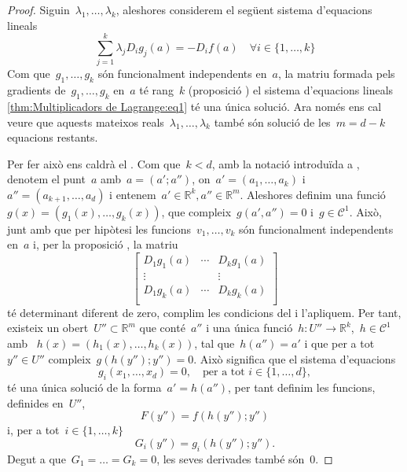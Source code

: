 \documentclass[../../main.tex]{subfiles}
\begin{document}
    \begin{proof}
        Siguin~\(\lambda_{1},\dots,\lambda_{k}\), aleshores considerem el següent sistema d'equacions lineals
        \begin{equation}\label{thm:Multiplicadors de Lagrange:eq1}
        \sum_{j=1}^{k}\lambda_{j}D_{i}g_{j}(a)=-D_{i}f(a)\quad\forall i\in\{1,\dots,k\}
        \end{equation}
        Com que~\(g_{1},\dots,g_{k}\) són funcionalment independents en~\(a\),
        la matriu formada pels gradients de~\(g_{1},\dots,g_{k}\) en~\(a\) té
        rang~\(k\) (proposició ) el sistema d'equacions lineals \eqref{thm:Multiplicadors de Lagrange:eq1} té una única solució.
        Ara només ens cal veure que aquests mateixos reals~\(\lambda_{1},\dots,\lambda_{k}\) també són solució de les~\(m=d-k\) equacions restants.

        Per fer això ens caldrà el .
        Com que~\(k<d\), amb la notació introduïda a , denotem el punt~\(a\) amb~\(a=(a';a'')\), on~\(a'=(a_{1},\dots,a_{k})\) i~\(a''=(a_{k+1},\dots,a_{d})\) i entenem~\(a'\in\mathbb{R}^{k},a''\in\mathbb{R}^{m}\).
        Aleshores definim una funció~\(g(x)=(g_{1}(x),\dots,g_{k}(x))\), que compleix~\(g(a',a'')=0\) i~\(g\in\mathcal{C}^{1}\).
        Això, junt amb que per hipòtesi les funcions~\(v_{1},\dots,v_{k}\) són funcionalment independents en~\(a\) i, per la proposició , la matriu
        \[\left[\begin{matrix}
        D_{1}g_{1}(a) & \cdots & D_{k}g_{1}(a)\\
        \vdots & & \vdots\\
        D_{1}g_{k}(a) & \cdots & D_{k}g_{k}(a)\\
        \end{matrix}\right]\]
        té determinant diferent de zero, complim les condicions del  i l'apliquem.
        Per tant, existeix un obert~\(U''\subset\mathbb{R}^{m}\) que conté~\(a''\) i una única funció~\(h\colon U''\to\mathbb{R}^{k}\),~\(h\in\mathcal{C}^{1}\) amb ~\(h(x)=(h_{1}(x),\dots,h_{k}(x))\), tal que~\(h(a'')=a'\) i que per a tot~\(y''\in U''\) compleix~\(g(h(y'');y'')=0\).
        Això significa que el sistema d'equacions
        \[
            g_{i}(x_{1},\dots,x_{d})=0,\quad\text{per a tot }i\in\{1,\dots,d\},
        \]
        té una única solució de la forma~\(a'=h(a'')\), per tant definim les funcions, definides en~\(U''\),
        \[
            F(y'')=f(h(y'');y'')
        \]
        i, per a tot~\(i\in\{1,\dots,k\}\)
        \[
            G_{i}(y'')=g_{i}(h(y'');y'').
        \]
        Degut a que~\(G_{1}=\dots=G_{k}=0\), les seves derivades també són~\(0\).
    \end{proof}
\end{document}
